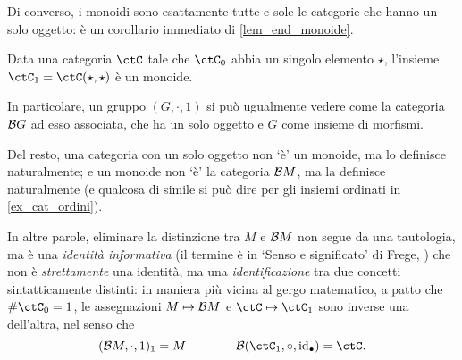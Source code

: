 Di converso, i monoidi sono esattamente tutte e sole le categorie che hanno un solo oggetto: è un corollario immediato di \ref{lem_end_monoide}.
\begin{theorem}\label{cat_sonomon}
	Data una categoria \(\ctC\) tale che \(\ctC_0\) abbia un singolo elemento \(\star\), l'insieme \(\ctC_1 = \Hom{\ctC}(\star,\star)\) è un monoide.
\end{theorem}
\begin{corollary}\label{cor_cat_mon}
	In particolare, un gruppo \((G,\cdot,1)\) si può ugualmente vedere come la categoria \(\mathcal{B} G\) ad esso associata, che ha un solo oggetto e \(G\) come insieme di morfismi.
\end{corollary}
\begin{remark}
	Del resto, una categoria con un solo oggetto non `è' un monoide, ma lo definisce naturalmente; e un monoide non `è' la categoria \(\mathcal{B} M\), ma la definisce naturalmente (e qualcosa di simile si può dire per gli insiemi ordinati in \ref{ex_cat_ordini}).

	In altre parole, eliminare la distinzione tra \(M\) e \(\mathcal{B} M\) non segue da una tautologia, ma è una \emph{identità informativa} (il termine è in `Senso e significato' di Frege, \cite{frege1892sinn}) che non è \emph{strettamente} una identità, ma una \emph{identificazione} tra due concetti sintatticamente distinti: in maniera più vicina al gergo matematico, a patto che \(\#\ctC_0 = 1\), le assegnazioni \(M\mapsto \mathcal{B} M\) e \(\ctC\mapsto \ctC_1\) sono inverse una dell'altra, nel senso che
	\[(\susp M,\cdot,1)_1 = M\qquad\qquad\susp(\ctC_1,\circ,\id_\bullet) = \ctC.\]
\end{remark}
